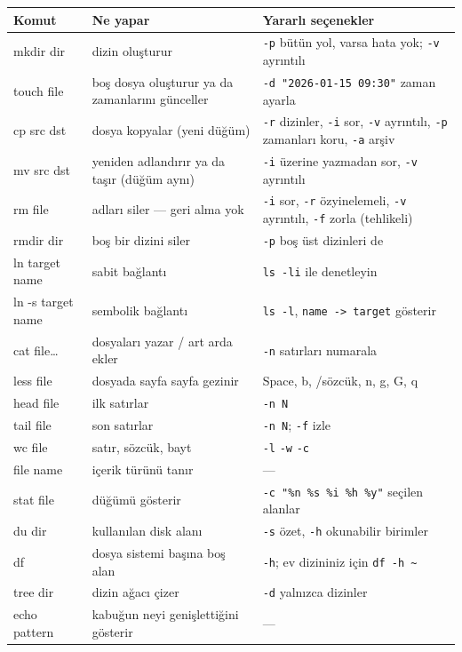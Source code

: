 \documentclass[11pt,a4paper]{article}
\newcommand{\cmd}[1]{\texttt{#1}}
\begin{document}
{\footnotesize
\renewcommand{\arraystretch}{1.15}
\begin{longtable}{@{}>{\ttfamily}p{3.3cm} p{5.2cm} >{\raggedright\arraybackslash}p{6.0cm}@{}}
\toprule
\textrm{\textbf{Komut}} & \textbf{Ne yapar} & \textbf{Yararlı seçenekler} \\
\midrule
\endhead
mkdir dir & dizin oluşturur & \cmd{-p} bütün yol, varsa hata yok; \cmd{-v} ayrıntılı \\
touch file & boş dosya oluşturur ya da zamanlarını günceller & \cmd{-d "2026-01-15 09:30"} zaman ayarla \\
cp src dst & dosya kopyalar (yeni düğüm) & \cmd{-r} dizinler, \cmd{-i} sor, \cmd{-v} ayrıntılı, \cmd{-p} zamanları koru, \cmd{-a} arşiv \\
mv src dst & yeniden adlandırır ya da taşır (düğüm aynı) & \cmd{-i} üzerine yazmadan sor, \cmd{-v} ayrıntılı \\
rm file & adları siler --- geri alma yok & \cmd{-i} sor, \cmd{-r} özyinelemeli, \cmd{-v} ayrıntılı, \cmd{-f} zorla (tehlikeli) \\
rmdir dir & boş bir dizini siler & \cmd{-p} boş üst dizinleri de \\
ln target name & sabit bağlantı & \cmd{ls -li} ile denetleyin \\
ln -s target name & sembolik bağlantı & \cmd{ls -l}, \texttt{name -> target} gösterir \\
cat file\dots & dosyaları yazar / art arda ekler & \cmd{-n} satırları numarala \\
less file & dosyada sayfa sayfa gezinir & Space, b, /sözcük, n, g, G, q \\
head file & ilk satırlar & \cmd{-n N} \\
tail file & son satırlar & \cmd{-n N}; \cmd{-f} izle \\
wc file & satır, sözcük, bayt & \cmd{-l} \cmd{-w} \cmd{-c} \\
file name & içerik türünü tanır & --- \\
stat file & düğümü gösterir & \cmd{-c "\%n \%s \%i \%h \%y"} seçilen alanlar \\
du dir & kullanılan disk alanı & \cmd{-s} özet, \cmd{-h} okunabilir birimler \\
df & dosya sistemi başına boş alan & \cmd{-h}; ev dizininiz için \cmd{df -h \textasciitilde} \\
tree dir & dizin ağacı çizer & \cmd{-d} yalnızca dizinler \\
echo pattern & kabuğun neyi genişlettiğini gösterir & --- \\
\bottomrule
\end{longtable}
}
\end{document}
